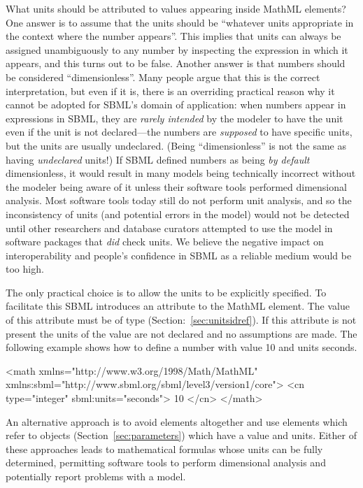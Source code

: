 What units should be attributed to values appearing inside MathML
 elements?  One answer is to assume that the units
should be ``whatever units appropriate in the context where the
number appears''.  This implies that units can always be assigned
unambiguously to any number by inspecting the expression in which
it appears, and this turns out to be false.  Another answer is
that numbers should be considered ``dimensionless''.  Many people
argue that this is the correct interpretation, but even if it is,
there is an overriding practical reason why it cannot be adopted
for SBML's domain of application: when numbers appear in 
expressions in SBML, they are \emph{rarely intended} by the
modeler to have the unit  even if
the unit is not declared---the numbers are \emph{supposed} to
have specific units, but the units are usually undeclared.  (Being
``dimensionless'' is not the same as having \emph{undeclared}
units!)  If SBML defined numbers as being \emph{by default}
dimensionless, it would result in many models being technically
incorrect without the modeler being aware of it unless their
software tools performed dimensional analysis.  Most software
tools today still do not perform unit analysis, and so the
inconsistency of units (and potential errors in the model) would not
be detected until other researchers and database curators
attempted to use the model in software packages that \emph{did}
check units.  We believe the negative impact on interoperability
and people's confidence in SBML as a reliable medium would be too
high.

The only practical choice is to allow the units to be explicitly
specified. To facilitate this SBML introduces an attribute
 to the MathML  element. The value of
this attribute must be of type 
(Section:~\vref{sec:unitsidref}). If this attribute is not present
the units of the value are not declared and no assumptions are
made. The following example shows how to define a number with
value 10 and units seconds. 

\begin{example}
<math xmlns="http://www.w3.org/1998/Math/MathML"
      xmlns:sbml="http://www.sbml.org/sbml/level3/version1/core">
    <cn type="integer" sbml:units="seconds"> 10 </cn>
</math>
\end{example}

An alternative approach is to avoid  elements
altogether and use  elements which refer to \Parameter
objects (Section~\ref{sec:parameters}) which have a value and
units. Either of these approaches leads to mathematical formulas
whose units can be fully determined, permitting software tools to
perform dimensional analysis and potentially report problems with
a model. 

